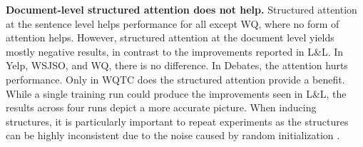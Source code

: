 \medskip
\noindent\textbf{Document-level structured attention does not help.} Structured attention at the sentence level helps performance for all except WQ, where no form of attention helps. However, structured attention at the document level yields mostly negative results, in contrast to the improvements reported in L\&L. In Yelp, WSJSO, and WQ, there is no difference. In Debates, the attention hurts performance. Only in WQTC does the structured attention provide a benefit. While a single training run could produce the improvements seen in L\&L, the results across four runs depict a more accurate picture. When inducing structures, it is particularly important to repeat experiments as the structures can be highly inconsistent due to the noise caused by random initialization \cite{Williams:2018}.   




